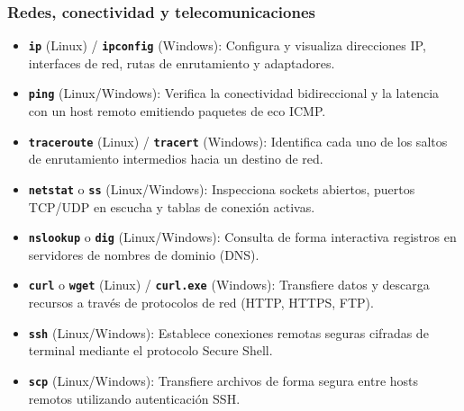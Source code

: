 \documentclass[12pt]{article}
\begin{document}
\subsubsection{Redes, conectividad y telecomunicaciones}
\begin{itemize}[leftmargin=*, noitemsep, topsep=2pt]
    \item \textbf{\texttt{ip}} (Linux) / \textbf{\texttt{ipconfig}} (Windows): Configura y visualiza direcciones IP, interfaces de red, rutas de enrutamiento y adaptadores.
    \item \textbf{\texttt{ping}} (Linux/Windows): Verifica la conectividad bidireccional y la latencia con un host remoto emitiendo paquetes de eco ICMP.
    \item \textbf{\texttt{traceroute}} (Linux) / \textbf{\texttt{tracert}} (Windows): Identifica cada uno de los saltos de enrutamiento intermedios hacia un destino de red.
    \item \textbf{\texttt{netstat}} o \textbf{\texttt{ss}} (Linux/Windows): Inspecciona sockets abiertos, puertos TCP/UDP en escucha y tablas de conexión activas.
    \item \textbf{\texttt{nslookup}} o \textbf{\texttt{dig}} (Linux/Windows): Consulta de forma interactiva registros en servidores de nombres de dominio (DNS).
    \item \textbf{\texttt{curl}} o \textbf{\texttt{wget}} (Linux) / \textbf{\texttt{curl.exe}} (Windows): Transfiere datos y descarga recursos a través de protocolos de red (HTTP, HTTPS, FTP).
    \item \textbf{\texttt{ssh}} (Linux/Windows): Establece conexiones remotas seguras cifradas de terminal mediante el protocolo Secure Shell.
    \item \textbf{\texttt{scp}} (Linux/Windows): Transfiere archivos de forma segura entre hosts remotos utilizando autenticación SSH.
\end{itemize}
\end{document}
